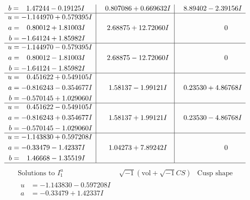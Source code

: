 \documentclass[1p]{elsarticle_modified}
\theoremstyle{definition}
\newcommand{\I}{\sqrt{-1}}
\begin{document}
$$\begin{array}{c|c|c}
\begin{aligned}
b &= \phantom{-}1.47244 - 0.19125 I\end{aligned}
 & \phantom{-}0.807086 + 0.669632 I & \phantom{-}8.89402 - 2.39156 I \\ \hline\begin{aligned}
u &= -1.144970 + 0.579395 I \\
a &= \phantom{-}0.80012 + 1.81003 I \\
b &= -1.64124 + 1.85982 I\end{aligned}
 & \phantom{-}2.68875 + 12.72060 I & \phantom{-0.000000 } 0 \\ \hline\begin{aligned}
u &= -1.144970 - 0.579395 I \\
a &= \phantom{-}0.80012 - 1.81003 I \\
b &= -1.64124 - 1.85982 I\end{aligned}
 & \phantom{-}2.68875 - 12.72060 I & \phantom{-0.000000 } 0 \\ \hline\begin{aligned}
u &= \phantom{-}0.451622 + 0.549105 I \\
a &= -0.816243 - 0.354677 I \\
b &= -0.570145 + 1.029060 I\end{aligned}
 & \phantom{-}1.58137 - 1.99121 I & \phantom{-}0.23530 + 4.86768 I \\ \hline\begin{aligned}
u &= \phantom{-}0.451622 - 0.549105 I \\
a &= -0.816243 + 0.354677 I \\
b &= -0.570145 - 1.029060 I\end{aligned}
 & \phantom{-}1.58137 + 1.99121 I & \phantom{-}0.23530 - 4.86768 I \\ \hline\begin{aligned}
u &= -1.143830 + 0.597208 I \\
a &= -0.33479 - 1.42337 I \\
b &= \phantom{-}1.46668 - 1.35519 I\end{aligned}
 & \phantom{-}1.04273 + 7.89242 I & \phantom{-0.000000 } 0\\
 \hline 
 \end{array}$$\newpage$$\begin{array}{c|c|c}  
\text{Solutions to }I^u_{1}& \I (\text{vol} + \sqrt{-1}CS) & \text{Cusp shape}\\
 \hline 
\begin{aligned}
u &= -1.143830 - 0.597208 I \\
a &= -0.33479 + 1.42337 I \\

\end{aligned}
\end{array}$$
\end{document}
